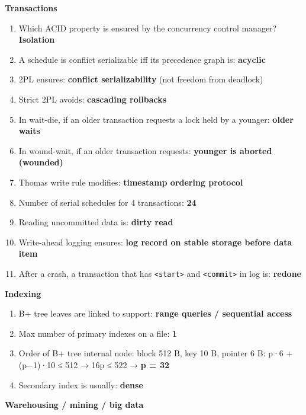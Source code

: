 \textbf{Transactions}

\begin{enumerate}
\def\labelenumi{\arabic{enumi}.}
\setcounter{enumi}{27}
\tightlist
\item
  Which ACID property is ensured by the concurrency control manager? \textbf{Isolation}
\item
  A schedule is conflict serializable iff its precedence graph is: \textbf{acyclic}
\item
  2PL ensures: \textbf{conflict serializability} (not freedom from deadlock)
\item
  Strict 2PL avoids: \textbf{cascading rollbacks}
\item
  In wait-die, if an older transaction requests a lock held by a younger: \textbf{older waits}
\item
  In wound-wait, if an older transaction requests: \textbf{younger is aborted (wounded)}
\item
  Thomas\textquotesingle{} write rule modifies: \textbf{timestamp ordering protocol}
\item
  Number of serial schedules for 4 transactions: \textbf{24}
\item
  Reading uncommitted data is: \textbf{dirty read}
\item
  Write-ahead logging ensures: \textbf{log record on stable storage before data item}
\item
  After a crash, a transaction that has \texttt{\textless{}start\textgreater{}} and \texttt{\textless{}commit\textgreater{}} in log is: \textbf{redone}
\end{enumerate}

\textbf{Indexing}

\begin{enumerate}
\def\labelenumi{\arabic{enumi}.}
\setcounter{enumi}{38}
\tightlist
\item
  B+ tree leaves are linked to support: \textbf{range queries / sequential access}
\item
  Max number of primary indexes on a file: \textbf{1}
\item
  Order of B+ tree internal node: block 512 B, key 10 B, pointer 6 B: p·6 + (p−1)·10 ≤ 512 → 16p ≤ 522 → \textbf{p = 32}
\item
  Secondary index is usually: \textbf{dense}
\end{enumerate}

\textbf{Warehousing / mining / big data}

